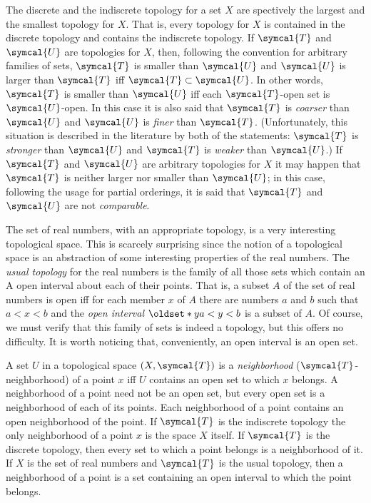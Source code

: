 The discrete and the indiscrete topology for a set \(X\) are spectively the largest and the smallest topology for \(X\). That is, every topology for \(X\) is contained in the discrete topology and contains the indiscrete topology. If \(\symcal{T}\) and \(\symcal{U}\) are topologies for \(X\), then, following the convention for arbitrary families of sets, \(\symcal{T}\) is smaller than \(\symcal{U}\) and \(\symcal{U}\) is larger than \(\symcal{T}\) iff \(\symcal{T}\subset\symcal{U}\). In other words, \(\symcal{T}\) is smaller than \(\symcal{U}\) iff each \(\symcal{T}\)-open set is \(\symcal{U}\)-open. In this case it is also said that \(\symcal{T}\) is \emph{coarser} than \(\symcal{U}\) and \(\symcal{U}\) is \emph{finer} than \(\symcal{T}\). (Unfortunately, this situation is described in the literature by both of the statements: \(\symcal{T}\) is \emph{stronger} than \(\symcal{U}\) and \(\symcal{T}\) is \emph{weaker} than \(\symcal{U}\).) If \(\symcal{T}\) and \(\symcal{U}\) are arbitrary topologies for \(X\) it may happen that \(\symcal{T}\) is neither larger nor smaller than \(\symcal{U}\); in this case, following the usage for partial orderings, it is said that \(\symcal{T}\) and \(\symcal{U}\) are not \emph{comparable}.

The set of real numbers, with an appropriate topology, is a very interesting topological space. This is scarcely surprising since the notion of a topological space is an abstraction of some interesting properties of the real numbers. The \emph{usual topology} for the real numbers is the family of all those sets which contain an A open interval about each of their points. That is, a subset \(A\) of the set of real numbers is open iff for each member \(x\) of \(A\) there are numbers \(a\) and \(b\) such that \(a<x<b\) and the \emph{open interval} \(\set{y}[a<y<b]\) is a subset of \(A\). Of course, we must verify that this family of sets is indeed a topology, but this offers no difficulty. It is worth noticing that, conveniently, an open interval is an open set.

A set \(U\) in a topological space \(\left(X,\symcal{T}\right)\) is a \emph{neighborhood} (\(\symcal{T}\)-neighborhood) of a point \(x\) iff \(U\) contains an open set to which \(x\) belongs. A neighborhood of a point need not be an open set, but every open set is a neighborhood of each of its points. Each neighborhood of a point contains an open neighborhood of the point. If \(\symcal{T}\) is the indiscrete topology the only neighborhood of a point \(x\) is the space \(X\) itself. If \(\symcal{T}\) is the discrete topology, then every set to which a point belongs is a neighborhood of it. If \(X\) is the set of real numbers and \(\symcal{T}\) is the usual topology, then a neighborhood of a point is a set containing an open interval to which the point belongs.

